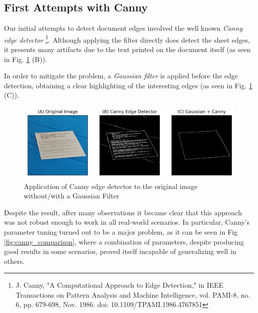 \documentclass[a4paper]{article}
\begin{document}
\subsection{First Attempts with Canny}

Our initial attempts to detect document edges involved the well known \textit{Canny edge detector} \footnote{J. Canny, "A Computational Approach to Edge Detection," in IEEE Transactions on Pattern Analysis and Machine Intelligence, vol. PAMI-8, no. 6, pp. 679-698, Nov. 1986.
	doi: 10.1109/TPAMI.1986.4767851}. 
Although applying the filter directly does detect the sheet edges, it presents many artifacts
due to the text printed on the document itself (as seen in Fig. \ref{fig:canny_gaussian} (B)).

In order to mitigate the problem, a \textit{Gaussian filter} is applied before the edge detection, obtaining a clear highlighting of the interesting edges (as seen in Fig.  \ref{fig:canny_gaussian} (C)).

\begin{figure}[!htb]
	\includegraphics[width=\linewidth]{canny_gaussian.png}
	\caption{Application of Canny edge detector to the original image without/with a Gaussian Filter}
	\label{fig:canny_gaussian}
\end{figure}

Despite the result, after many observations it became clear that this approach was not robust enough to
work in all real-world scenarios. In particular, Canny's parameter tuning turned out to be a major
problem, as it can be seen in Fig \ref{fig:canny_comparison}, where a combination of parameters,
despite producing good results in some scenarios, proved itself incapable of generalizing well in others.
\end{document}
